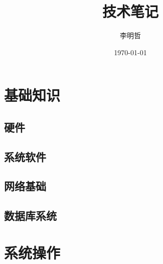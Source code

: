 \documentclass[11pt,a4paper]{report}
\title{\sffamily 技术笔记}
\author{李明哲}
\date{\today}
\begin{document}
\maketitle
\tableofcontents

\titleformat{\section}{\large\raggedright\sffamily}{\thesection}{1em}{}
\titleformat{\subsection}{\normalfont\raggedright\sffamily}{\thesubsection}{1em}{}
\titleformat{\subsubsection}{\normalfont\raggedright\sffamily}{\thesubsubsection}{1em}{}

\part{基础知识}
\chapter{硬件}

\chapter{系统软件}

\chapter{网络基础}

\chapter{数据库系统}


\part{系统操作}
\end{document}
